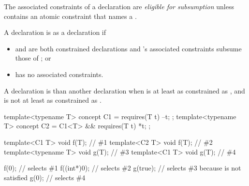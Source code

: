 \documentclass{wg21}
\begin{document}
\begin{addedblock}

    The associated constraints  of a declaration  are \emph{eligible for subsumption}
    unless  contains an atomic constraint that names a  .

\end{addedblock}


\pnum
A declaration  is
 as
a declaration  if
\begin{itemize}
    \item {} and  are both constrained declarations and
    's associated constraints
     subsume those of ; or

    \item {} has no associated constraints.
\end{itemize}

\pnum
A declaration  is 
than another declaration  when  is at least as
constrained as , and  is not at least as
constrained as .
\begin{example}
\begin{codeblock}
    template<typename T> concept C1 = requires(T t) { --t; };
    template<typename T> concept C2 = C1<T> && requires(T t) { *t; };

    template<C1 T> void f(T);       // \#1
    template<C2 T> void f(T);       // \#2
    template<typename T> void g(T); // \#3
    template<C1 T> void g(T);       // \#4

    f(0);                           // selects \#1
    f((int*)0);                     // selects \#2
    g(true);                        // selects \#3 because  is not satisfied
    g(0);                           // selects \#4
\end{codeblock}
\end{example}
\end{document}
